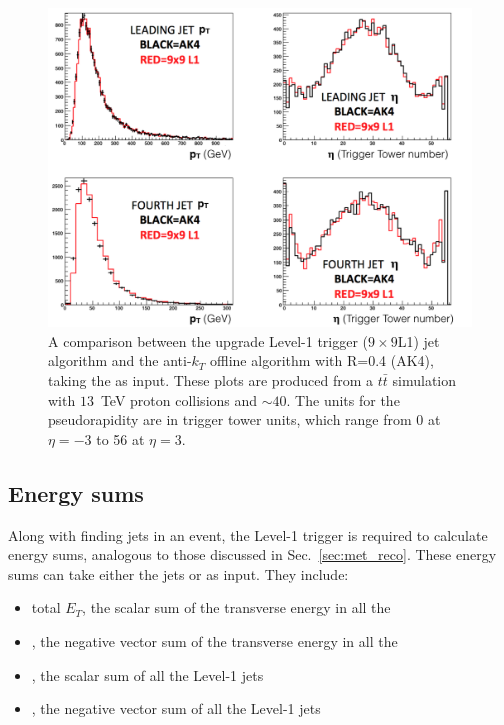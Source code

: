 \begin{figure}
	\begin{center}
		\includegraphics[width=1.0\linewidth]{figs/trigger/jet_l1s2_compak4}
	\end{center}
  \caption{A comparison between the upgrade Level-1 trigger ($9\times9$L1) jet
  algorithm and the anti-$k_T$ offline algorithm with R=0.4 
  (AK4), taking
  the \TTs as input.  These plots are produced from a
  $t\bar{t}$ simulation with $13$~TeV proton collisions and \PU $\sim40$.
  The units for the pseudorapidity are in trigger tower units, which
  range from 0 at $\eta =-3$ to 56 at $\eta=3$.}
	\label{fig:ak4_comp}
\end{figure}

\subsection{Energy sums}

Along with finding jets in an event, the Level-1 trigger is required
to calculate energy sums, analogous to those discussed in
Sec.~\ref{sec:met_reco}.  These energy sums can take either the jets
or \TTs as input. They include:
\begin{itemize}
\item{total $E_T$, the scalar sum of the transverse energy in all the
\TTs}
\item{\met, the negative vector sum of the transverse energy in all the
\TTs}
\item{\HT, the scalar sum of all the Level-1 jets}
\item{\MHT, the negative vector sum of all the Level-1 jets}
\end{itemize}

